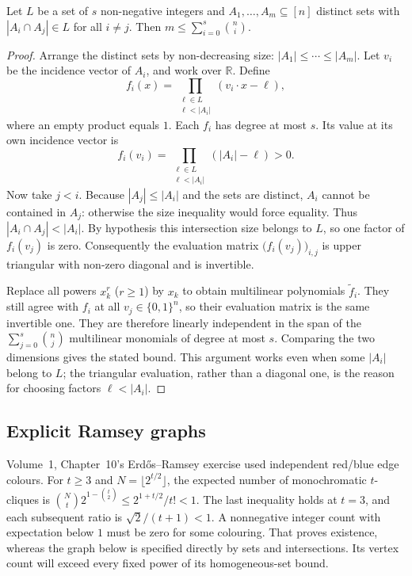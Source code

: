 \begin{theorem}\label{combinatorial:thm:fw}
Let $L$ be a set of $s$ non-negative integers and $A_1,\dots,A_m\subseteq[n]$ distinct sets with $|A_i\cap A_j|\in L$ for all $i\ne j$. Then $m\le\sum_{i=0}^s\binom ni$.
\end{theorem}
\begin{proof}
Arrange the distinct sets by non-decreasing size:
$|A_1|\le\cdots\le|A_m|$. Let $v_i$ be the incidence
vector of $A_i$, and work over $\mathbb R$. Define
\[
f_i(x)=
\prod_{\substack{\ell\in L\\\ell<|A_i|}}
(v_i\cdot x-\ell),
\]
where an empty product equals $1$. Each $f_i$ has
degree at most $s$. Its value at its own incidence
vector is
\[
f_i(v_i)=
\prod_{\substack{\ell\in L\\\ell<|A_i|}}
(|A_i|-\ell)>0.
\]
Now take $j<i$. Because $|A_j|\le|A_i|$ and the sets
are distinct, $A_i$ cannot be contained in $A_j$:
otherwise the size inequality would force equality.
Thus $|A_i\cap A_j|<|A_i|$. By hypothesis this
intersection size belongs to $L$, so one factor
of $f_i(v_j)$ is zero. Consequently the evaluation
matrix $\bigl(f_i(v_j)\bigr)_{i,j}$ is upper triangular
with non-zero diagonal and is invertible.

Replace all powers $x_k^r$ ($r\ge1$) by $x_k$ to obtain
multilinear polynomials $\widetilde f_i$. They still
agree with $f_i$ at all $v_j\in\{0,1\}^n$, so their
evaluation matrix is the same invertible one. They
are therefore linearly independent in the span of
the $\sum_{j=0}^s\binom nj$ multilinear monomials
of degree at most $s$. Comparing the two dimensions
gives the stated bound. This argument works even
when some $|A_i|$ belong to $L$; the triangular
evaluation, rather than a diagonal one, is the
reason for choosing factors $\ell<|A_i|$.
\end{proof}

\subsection*{Explicit Ramsey graphs}

Volume~1, Chapter~10's Erd\H os--Ramsey exercise used independent red/blue
edge colours. For $t\ge3$ and $N=\lfloor2^{t/2}\rfloor$, the expected number
of monochromatic $t$-cliques is
$\binom{N}{t}2^{1-\binom t2}\le2^{1+t/2}/t!<1$.
The last inequality holds at $t=3$, and each subsequent ratio is
$\sqrt2/(t+1)<1$. A nonnegative integer count with expectation below $1$
must be zero for some colouring. That proves existence, whereas the graph
below is specified directly by sets and intersections. Its vertex count
will exceed every fixed power of its homogeneous-set bound.

